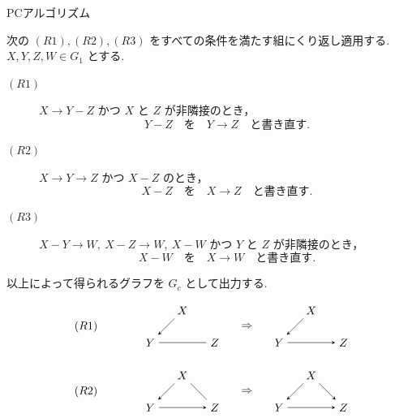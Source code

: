 \documentclass[uplatex, dvipdfmx]{jsarticle}
\begin{document}
\begin{defn}{PCアルゴリズム}
\begin{enumerate}
    次の $(R1),(R2),(R3)$ をすべての条件を満たす組にくり返し適用する.
    $X,Y,Z,W\in G_1$ とする.

    \begin{description}
      \item[$(R1)$]
        $X\to Y-Z$ かつ $X$ と $Z$ が非隣接のとき，
        \[
          Y-Z
          \quad\text{を}\quad
          Y\to Z
          \quad\text{と書き直す.}
        \]

      \item[$(R2)$]
        $X\to Y\to Z$ かつ $X-Z$ のとき，
        \[
          X-Z
          \quad\text{を}\quad
          X\to Z
          \quad\text{と書き直す.}
        \]

      \item[$(R3)$]
        $X-Y\to W,\ X-Z\to W,\ X-W$ かつ $Y$ と $Z$ が非隣接のとき，
        \[
          X-W
          \quad\text{を}\quad
          X\to W
          \quad\text{と書き直す.}
        \]
    \end{description}

    以上によって得られるグラフを $G_c$ として出力する.
\end{enumerate}

\[
\begin{tikzpicture}[>=stealth, node distance=1.5cm]
  \node (R1) at (-3,0.5) {$(R1)$};
  \node (X1) at (0,1) {$X$};
  \node (Y1) at (-1,0) {$Y$};
  \node (Z1) at (1,0) {$Z$};

  \draw[->] (X1) -- (Y1);
  \draw[-] (Y1) -- (Z1);

  \node at (2,0.5) {$\Rightarrow$};

  \node (X2) at (4,1) {$X$};
  \node (Y2) at (3,0) {$Y$};
  \node (Z2) at (5,0) {$Z$};

  \draw[->] (X2) -- (Y2);
  \draw[->] (Y2) -- (Z2);
\end{tikzpicture}
\]

\[
\begin{tikzpicture}[>=stealth, node distance=1.5cm]
  \node (R2) at (-3,0.5) {$(R2)$};
  \node (X1) at (0,1) {$X$};
  \node (Y1) at (-1,0) {$Y$};
  \node (Z1) at (1,0) {$Z$};

  \draw[->] (X1) -- (Y1);
  \draw[->] (Y1) -- (Z1);
  \draw[-] (X1) -- (Z1);

  \node at (2,0.5) {$\Rightarrow$};

  \node (X2) at (4,1) {$X$};
  \node (Y2) at (3,0) {$Y$};
  \node (Z2) at (5,0) {$Z$};

  \draw[->] (X2) -- (Y2);
  \draw[->] (Y2) -- (Z2);
  \draw[->] (X2) -- (Z2);
\end{tikzpicture}
\]


\end{defn}
\end{document}
